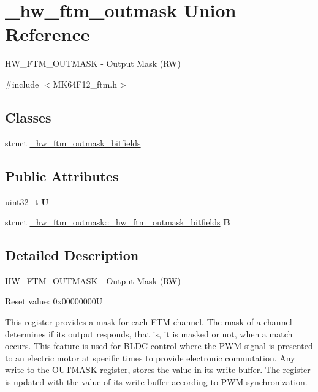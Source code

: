 \hypertarget{union__hw__ftm__outmask}{}\section{\+\_\+hw\+\_\+ftm\+\_\+outmask Union Reference}
\label{union__hw__ftm__outmask}


H\+W\+\_\+\+F\+T\+M\+\_\+\+O\+U\+T\+M\+A\+SK -\/ Output Mask (RW)  




{\ttfamily \#include $<$M\+K64\+F12\+\_\+ftm.\+h$>$}

\subsection*{Classes}
\begin{DoxyCompactItemize}
\item 
struct \hyperlink{struct__hw__ftm__outmask_1_1__hw__ftm__outmask__bitfields}{\+\_\+hw\+\_\+ftm\+\_\+outmask\+\_\+bitfields}
\end{DoxyCompactItemize}
\subsection*{Public Attributes}
\begin{DoxyCompactItemize}
\item 
uint32\+\_\+t {\bfseries U}\hypertarget{union__hw__ftm__outmask_a4b1d7afd2724745fe9631877aebb8c2d}{}\label{union__hw__ftm__outmask_a4b1d7afd2724745fe9631877aebb8c2d}

\item 
struct \hyperlink{struct__hw__ftm__outmask_1_1__hw__ftm__outmask__bitfields}{\+\_\+hw\+\_\+ftm\+\_\+outmask\+::\+\_\+hw\+\_\+ftm\+\_\+outmask\+\_\+bitfields} {\bfseries B}\hypertarget{union__hw__ftm__outmask_a8afdf0c8888b654e31fea4f113feb69f}{}\label{union__hw__ftm__outmask_a8afdf0c8888b654e31fea4f113feb69f}

\end{DoxyCompactItemize}


\subsection{Detailed Description}
H\+W\+\_\+\+F\+T\+M\+\_\+\+O\+U\+T\+M\+A\+SK -\/ Output Mask (RW) 

Reset value\+: 0x00000000U

This register provides a mask for each F\+TM channel. The mask of a channel determines if its output responds, that is, it is masked or not, when a match occurs. This feature is used for B\+L\+DC control where the P\+WM signal is presented to an electric motor at specific times to provide electronic commutation. Any write to the O\+U\+T\+M\+A\+SK register, stores the value in its write buffer. The register is updated with the value of its write buffer according to P\+WM synchronization. 

